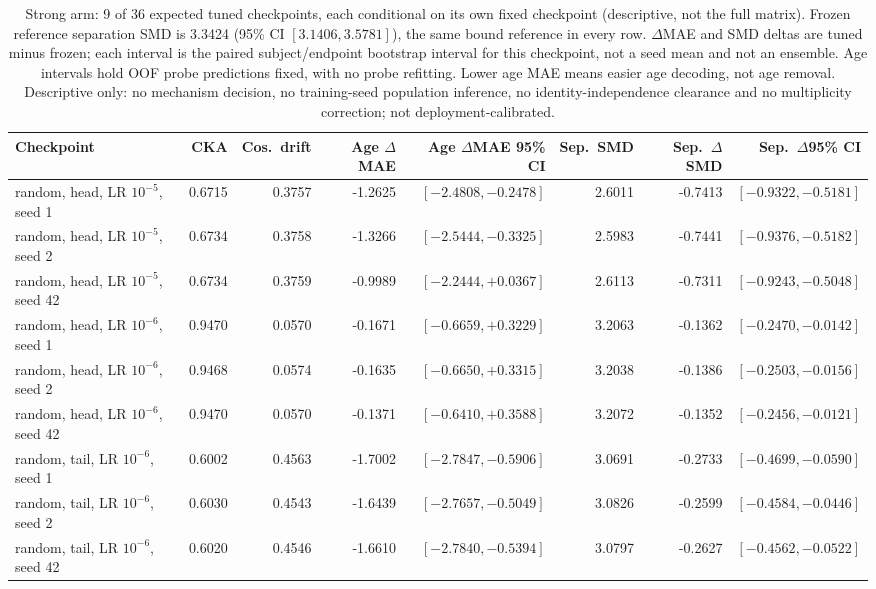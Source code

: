 \begin{table}[!t]
\caption{Strong arm: 9 of 36 expected tuned checkpoints, each conditional on its own fixed checkpoint (descriptive, not the full matrix). Frozen reference separation SMD is 3.3424 (95\% CI $[3.1406,3.5781]$), the same bound reference in every row. $\Delta$MAE and SMD deltas are tuned minus frozen; each interval is the paired subject/endpoint bootstrap interval for this checkpoint, not a seed mean and not an ensemble. Age intervals hold OOF probe predictions fixed, with no probe refitting. Lower age MAE means easier age decoding, not age removal. Descriptive only: no mechanism decision, no training-seed population inference, no identity-independence clearance and no multiplicity correction; not deployment-calibrated.}
\label{tab:common-mechanism-strong}
\centering\scriptsize
\begin{tabular}{@{}lrrrrrrr@{}}
\toprule
Checkpoint & CKA & Cos.\ drift & Age $\Delta$MAE & Age $\Delta$MAE 95\% CI & Sep.\ SMD & Sep.\ $\Delta$SMD & Sep.\ $\Delta$95\% CI \\
\midrule
random, head, LR $10^{-5}$, seed 1 & 0.6715 & 0.3757 & -1.2625 & $[-2.4808,-0.2478]$ & 2.6011 & -0.7413 & $[-0.9322,-0.5181]$ \\
random, head, LR $10^{-5}$, seed 2 & 0.6734 & 0.3758 & -1.3266 & $[-2.5444,-0.3325]$ & 2.5983 & -0.7441 & $[-0.9376,-0.5182]$ \\
random, head, LR $10^{-5}$, seed 42 & 0.6734 & 0.3759 & -0.9989 & $[-2.2444,+0.0367]$ & 2.6113 & -0.7311 & $[-0.9243,-0.5048]$ \\
random, head, LR $10^{-6}$, seed 1 & 0.9470 & 0.0570 & -0.1671 & $[-0.6659,+0.3229]$ & 3.2063 & -0.1362 & $[-0.2470,-0.0142]$ \\
random, head, LR $10^{-6}$, seed 2 & 0.9468 & 0.0574 & -0.1635 & $[-0.6650,+0.3315]$ & 3.2038 & -0.1386 & $[-0.2503,-0.0156]$ \\
random, head, LR $10^{-6}$, seed 42 & 0.9470 & 0.0570 & -0.1371 & $[-0.6410,+0.3588]$ & 3.2072 & -0.1352 & $[-0.2456,-0.0121]$ \\
random, tail, LR $10^{-6}$, seed 1 & 0.6002 & 0.4563 & -1.7002 & $[-2.7847,-0.5906]$ & 3.0691 & -0.2733 & $[-0.4699,-0.0590]$ \\
random, tail, LR $10^{-6}$, seed 2 & 0.6030 & 0.4543 & -1.6439 & $[-2.7657,-0.5049]$ & 3.0826 & -0.2599 & $[-0.4584,-0.0446]$ \\
random, tail, LR $10^{-6}$, seed 42 & 0.6020 & 0.4546 & -1.6610 & $[-2.7840,-0.5394]$ & 3.0797 & -0.2627 & $[-0.4562,-0.0522]$ \\
\bottomrule
\end{tabular}
\end{table}

